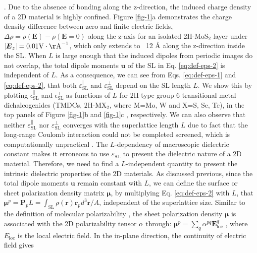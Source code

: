\documentclass[journal=ancac3,manuscript=article,email=true,hyperref=true,keywords=false]{achemso}
\begin{document}
. Due to the absence of bonding
along the z-direction, the induced charge density of a 2D material is
highly confined. Figure \ref{fig-1}a demonstrates the charge density
difference between zero and finite electric fields,
$\Delta \rho=\rho(\boldsymbol{E}) - \rho(\boldsymbol{E}=0)$ along the
z-axis for an isolated 2H-MoS$_{2}$ layer under
$|\boldsymbol{E}_{z}|=0.01 \mathrm{V\cdot \AA}^{-1}$, which only
extends to ~12 \AA{} along the z-direction inside the SL. When $L$ is
large enough that the induced dipoles from periodic images do not
overlap, the total dipole moments $\boldsymbol{u}$ of the SL in
Eq. \ref{eq:def-eps-2} is independent of $L$. As a consequence, we can
see from Eqs. \ref{eq:def-eps-1} and \ref{eq:def-eps-2}, that both
$\varepsilon^{\parallel}_{\mathrm{SL}}$ and
$\varepsilon^{\perp}_{\mathrm{SL}}$ depend on the SL length $L$. We
show this by plotting $\epsilon^{\parallel}_{\mathrm{SL}}$ and
$\epsilon^{\perp}_{\mathrm{SL}}$ as functions of $L$ for 2H-type group
6 transitional metal dichalcogenides (TMDCs, 2H-MX$_{2}$, where M=Mo,
W and X=S, Se, Te), in the top panels of Figure \ref{fig-1}b and
\ref{fig-1}c , respectively. We can also observe
that neither $\varepsilon^{\parallel}_{\mathrm{SL}}$ nor
$\varepsilon^{\perp}_{\mathrm{SL}}$ converges with the superlattice
length $L$ due to fact that the long-range Coulomb interaction could
not be completed screened, which is computationally unpractical
\cite{Hueser_2013_2Dvs3D}. The $L$-dependency of macroscopic
dielectric constant makes it erroneous to use
$\varepsilon_{\mathrm{SL}}$ to present the dielectric nature of a 2D
material. Therefore, we need to find a $L$-independent quantity to
present the intrinsic dielectric properties of the 2D materials. As
discussed previous, since the total dipole moments $\mathbf{u}$ remain
constant with $L$, we can define the surface or sheet polarization
density matrix $\boldsymbol{\mu}$, by multiplying
Eq. \ref{eq:def-eps-2} with $L$, that
$\boldsymbol{\mu}^{p} = \boldsymbol{P}_{p}L = \int_{\mathrm{SL}}
\rho(\boldsymbol{r}) \boldsymbol{r}_{p}d^{3} \boldsymbol{r}/A$,
independent of the superlattice size. Similar to the definition of
molecular polarizability \cite{Israelachvili_2011}, the sheet
polarization density $\boldsymbol{\mu}$ is associated with the 2D
polarizability tensor $\alpha$ through:
$\boldsymbol{\mu}^{p} = \sum_{q} \alpha^{pq}
\mathbf{E}_{\mathrm{loc}}^{q}$ \cite{T_bik_2004}, where
$E_{\mathrm{loc}}$ is the local electric field. In the in-plane
direction, the continuity of electric field gives
\end{document}
